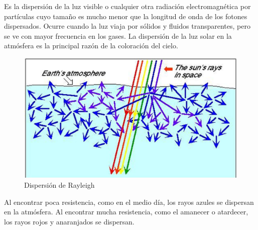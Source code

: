 Es la dispersión de la luz visible o cualquier otra radiación electromagnética por partículas cuyo tamaño es mucho menor que la longitud de onda de los fotones dispersados. Ocurre cuando la luz viaja por sólidos y fluidos transparentes, pero se ve con mayor frecuencia en los gases. La dispersión de la luz solar en la atmósfera es la principal razón de la coloración del cielo.

\begin{figure}[H]
  \centering
  \includegraphics[scale=0.2]{imagenes/rayleigh.png}
  \caption{Dispersión de Rayleigh\cite{confrayleigh}}
\end{figure}

Al encontrar poca resistencia, como en el medio día, los rayos azules se dispersan en la atmósfera. Al encontrar mucha resistencia, como el amanecer o atardecer, los rayos rojos y anaranjados se dispersan.
